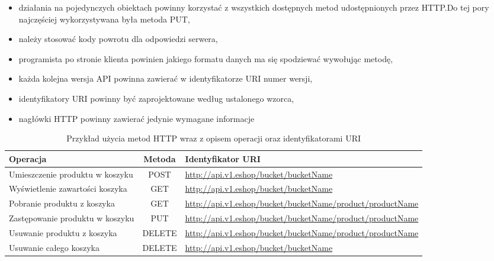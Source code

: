 \begin{itemize}
    \item działania na pojedynczych obiektach powinny korzystać z wszystkich dostępnych metod udostępnionych przez HTTP.\@ Do tej pory najczęściej wykorzystywana była metoda PUT,
    \item należy stosować kody powrotu dla odpowiedzi serwera,
    \item programista po stronie klienta powinien jakiego formatu danych ma się spodziewać wywołując metodę,
    \item każda kolejna wersja API powinna zawierać w identyfikatorze URI numer wersji,
    \item identyfikatory URI powinny być zaprojektowane według ustalonego wzorca,
    \item nagłówki HTTP powinny zawierać jedynie wymagane informacje
\end{itemize}
\begin{table}[h]
    \begin{center}
        \caption{Przykład użycia metod HTTP wraz z opisem operacji oraz identyfikatorami URI}
        \hspace*{-1cm}
        \begin{tabular}{|M|c|L|}
            \toprule
            \textbf{Operacja}               & \textbf{Metoda} & \textbf{Identyfikator URI}                                      \\
            \midrule
            Umieszczenie produktu w koszyku & POST            & \url{http://api.v1.eshop/bucket/bucketName}                     \\
            \midrule
            Wyświetlenie zawartości koszyka & GET             & \url{http://api.v1.eshop/bucket/bucketName}                     \\
            \midrule
            Pobranie produktu z koszyka     & GET             & \url{http://api.v1.eshop/bucket/bucketName/product/productName} \\
            \midrule
            Zastępowanie produktu w koszyku & PUT             & \url{http://api.v1.eshop/bucket/bucketName/product/productName} \\
            \midrule
            Usuwanie produktu z koszyka     & DELETE          & \url{http://api.v1.eshop/bucket/bucketName/product/productName} \\
            \midrule
            Usuwanie całego koszyka         & DELETE          & \url{http://api.v1.eshop/bucket/bucketName}                     \\
            \bottomrule
        \end{tabular}
        \hspace*{-1cm}
    \end{center}
\end{table}
